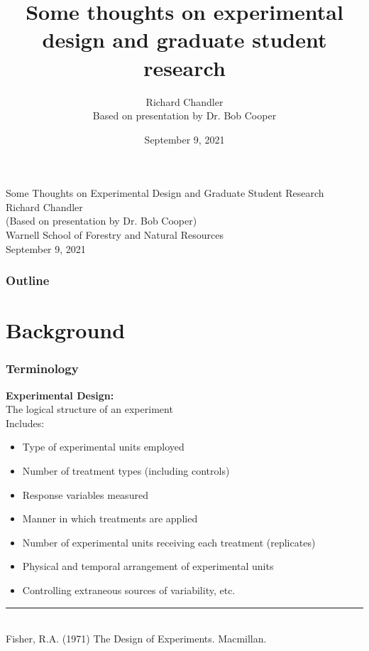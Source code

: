 \documentclass[color=usenames,dvipsnames]{beamer}\usepackage[]{graphicx}\usepackage[]{color}
\title[slides]{Some thoughts on experimental design and
  graduate student research}
\author{Richard Chandler \\ Based on presentation by Dr. Bob Cooper}
\date{September 9, 2021}
\begin{document}
\begin{frame}[plain]
  \centering
  \LARGE
  Some Thoughts on Experimental Design and Graduate Student Research \\
  \vfill
  \large
  Richard Chandler \\
  (Based on presentation by Dr. Bob Cooper) \\
  Warnell School of Forestry and Natural Resources \\
  September 9, 2021
\end{frame}



\begin{frame}
  \frametitle{Outline}
  
\end{frame}


\section{Background}

\begin{frame}
  \frametitle{Terminology}
  {\bf Experimental Design:} \\
  The logical structure of an experiment \\ %
  \vfill  
  Includes:
  \begin{itemize}
    \item Type of experimental units employed
    \item Number of treatment types (including controls)
    \item Response variables measured
    \item Manner in which treatments are applied
    \item Number of experimental units receiving each treatment (replicates)
    \item Physical and temporal arrangement of experimental units
    \item Controlling extraneous sources of variability, etc.
  \end{itemize}
  \vfill
  \vspace{6pt}
  \rule[0mm]{1cm}{0.1mm} \\
  \footnotesize
  Fisher, R.A. (1971) The Design of Experiments. Macmillan. 
\end{frame}
\end{document}
